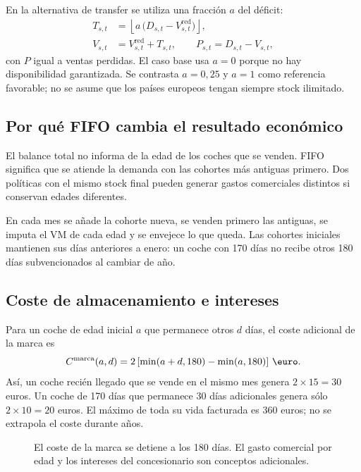 En la alternativa de transfer se utiliza una fracción $a$ del déficit:
\begin{align}
 T_{s,t}&=\left\lfloor a\,\bigl(D_{s,t}-V^{\mathrm{red}}_{s,t}\bigr)\right\rfloor,\\
 V_{s,t}&=V^{\mathrm{red}}_{s,t}+T_{s,t},\qquad
 P_{s,t}=D_{s,t}-V_{s,t},
\end{align}
con $P$ igual a ventas perdidas. El caso base usa $a=0$ porque no hay
disponibilidad garantizada. Se contrasta $a=0{,}25$ y $a=1$ como referencia
favorable; no se asume que los países europeos tengan siempre stock ilimitado.

\subsection{Por qué FIFO cambia el resultado económico}
El balance total no informa de la edad de los coches que se venden. FIFO
significa que se atiende la demanda con las cohortes más antiguas primero.
Dos políticas con el mismo stock final pueden generar gastos comerciales
distintos si conservan edades diferentes.

En cada mes se añade la cohorte nueva, se venden primero las antiguas, se
imputa el VM de cada edad y se envejece lo que queda. Las cohortes iniciales
mantienen sus días anteriores a enero: un coche con 170 días no recibe otros
180 días subvencionados al cambiar de año.

\subsection{Coste de almacenamiento e intereses}
Para un coche de edad inicial $a$ que permanece otros $d$ días, el coste adicional
de la marca es
\begin{equation}\label{eq:coste-stock}
 C^{\mathrm{marca}}(a,d)
 =2\left[\min(a+d,180)-\min(a,180)\right]\unidad{\euro}.
\end{equation}
Así, un coche recién llegado que se vende en el mismo mes genera
$2\times15=30$ euros. Un coche de 170 días que permanece 30 días adicionales
genera sólo $2\times10=20$ euros. El máximo de toda su vida facturada es
360 euros; no se extrapola el coste durante años.

\begin{figure}[htbp]\centering
{}
\caption{El coste de la marca se detiene a los 180 días. El gasto comercial por
edad y los intereses del concesionario son conceptos adicionales.}
\label{fig:coste-stock}
\end{figure}

